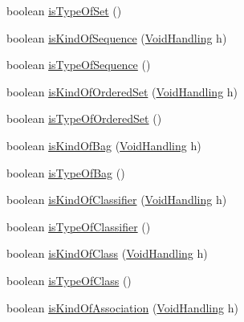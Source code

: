 \begin{DoxyCompactItemize}
\item 
boolean \hyperlink{interfaceorg_1_1tzi_1_1use_1_1uml_1_1ocl_1_1type_1_1_type_aa71c8a4daadc64a306e4ea3f63c50093}{is\-Type\-Of\-Set} ()
\item 
boolean \hyperlink{interfaceorg_1_1tzi_1_1use_1_1uml_1_1ocl_1_1type_1_1_type_aa3c15c81076df4301b3158c33583fea4}{is\-Kind\-Of\-Sequence} (\hyperlink{enumorg_1_1tzi_1_1use_1_1uml_1_1ocl_1_1type_1_1_type_1_1_void_handling}{Void\-Handling} h)
\item 
boolean \hyperlink{interfaceorg_1_1tzi_1_1use_1_1uml_1_1ocl_1_1type_1_1_type_a6cf666203056deb55404e863c4c2e5b8}{is\-Type\-Of\-Sequence} ()
\item 
boolean \hyperlink{interfaceorg_1_1tzi_1_1use_1_1uml_1_1ocl_1_1type_1_1_type_a25b0ab096b6c55a445fb8e58b7a26753}{is\-Kind\-Of\-Ordered\-Set} (\hyperlink{enumorg_1_1tzi_1_1use_1_1uml_1_1ocl_1_1type_1_1_type_1_1_void_handling}{Void\-Handling} h)
\item 
boolean \hyperlink{interfaceorg_1_1tzi_1_1use_1_1uml_1_1ocl_1_1type_1_1_type_aac343a8f837b9fe28b75b5adca44e6c2}{is\-Type\-Of\-Ordered\-Set} ()
\item 
boolean \hyperlink{interfaceorg_1_1tzi_1_1use_1_1uml_1_1ocl_1_1type_1_1_type_a4ddac97846410428b66d4c4cfb352ff0}{is\-Kind\-Of\-Bag} (\hyperlink{enumorg_1_1tzi_1_1use_1_1uml_1_1ocl_1_1type_1_1_type_1_1_void_handling}{Void\-Handling} h)
\item 
boolean \hyperlink{interfaceorg_1_1tzi_1_1use_1_1uml_1_1ocl_1_1type_1_1_type_ad8acfa61536595d94eba8e06d1c8860b}{is\-Type\-Of\-Bag} ()
\item 
boolean \hyperlink{interfaceorg_1_1tzi_1_1use_1_1uml_1_1ocl_1_1type_1_1_type_a1dd438c1ce960b1080d2892a1eef0530}{is\-Kind\-Of\-Classifier} (\hyperlink{enumorg_1_1tzi_1_1use_1_1uml_1_1ocl_1_1type_1_1_type_1_1_void_handling}{Void\-Handling} h)
\item 
boolean \hyperlink{interfaceorg_1_1tzi_1_1use_1_1uml_1_1ocl_1_1type_1_1_type_afc6d5798a18e843eef55516c1fc7c34e}{is\-Type\-Of\-Classifier} ()
\item 
boolean \hyperlink{interfaceorg_1_1tzi_1_1use_1_1uml_1_1ocl_1_1type_1_1_type_ae3b92b675b0086ce6889ac1da6ee3982}{is\-Kind\-Of\-Class} (\hyperlink{enumorg_1_1tzi_1_1use_1_1uml_1_1ocl_1_1type_1_1_type_1_1_void_handling}{Void\-Handling} h)
\item 
boolean \hyperlink{interfaceorg_1_1tzi_1_1use_1_1uml_1_1ocl_1_1type_1_1_type_a39221639036d06a7bf42316a61d7147c}{is\-Type\-Of\-Class} ()
\item 
boolean \hyperlink{interfaceorg_1_1tzi_1_1use_1_1uml_1_1ocl_1_1type_1_1_type_aa92ff553d86800237ab47c1da74812b8}{is\-Kind\-Of\-Association} (\hyperlink{enumorg_1_1tzi_1_1use_1_1uml_1_1ocl_1_1type_1_1_type_1_1_void_handling}{Void\-Handling} h)

\end{DoxyCompactItemize}
